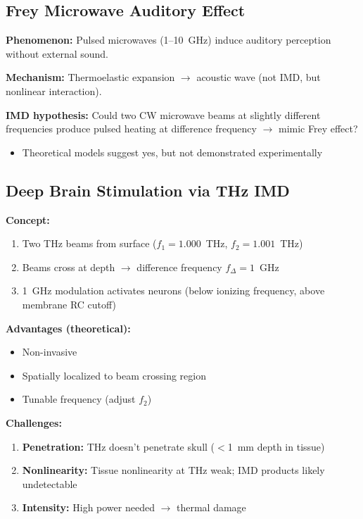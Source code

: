\subsection{Frey Microwave Auditory Effect}

\textbf{Phenomenon:} Pulsed microwaves (1--10~GHz) induce auditory perception without external sound.

\textbf{Mechanism:} Thermoelastic expansion $\rightarrow$ acoustic wave (not IMD, but nonlinear interaction).

\textbf{IMD hypothesis:} Could two CW microwave beams at slightly different frequencies produce pulsed heating at difference frequency $\rightarrow$ mimic Frey effect?
\begin{itemize}
\item Theoretical models suggest yes, but not demonstrated experimentally
\end{itemize}

\subsection{Deep Brain Stimulation via THz IMD}

\textbf{Concept:}
\begin{enumerate}
\item Two THz beams from surface ($f_1 = 1.000$~THz, $f_2 = 1.001$~THz)
\item Beams cross at depth $\rightarrow$ difference frequency $f_{\Delta} = 1$~GHz
\item 1~GHz modulation activates neurons (below ionizing frequency, above membrane RC cutoff)
\end{enumerate}

\textbf{Advantages (theoretical):}
\begin{itemize}
\item Non-invasive
\item Spatially localized to beam crossing region
\item Tunable frequency (adjust $f_2$)
\end{itemize}

\textbf{Challenges:}
\begin{enumerate}
\item \textbf{Penetration:} THz doesn't penetrate skull ($<$1~mm depth in tissue)
\item \textbf{Nonlinearity:} Tissue nonlinearity at THz weak; IMD products likely undetectable
\item \textbf{Intensity:} High power needed $\rightarrow$ thermal damage
\end{enumerate}

